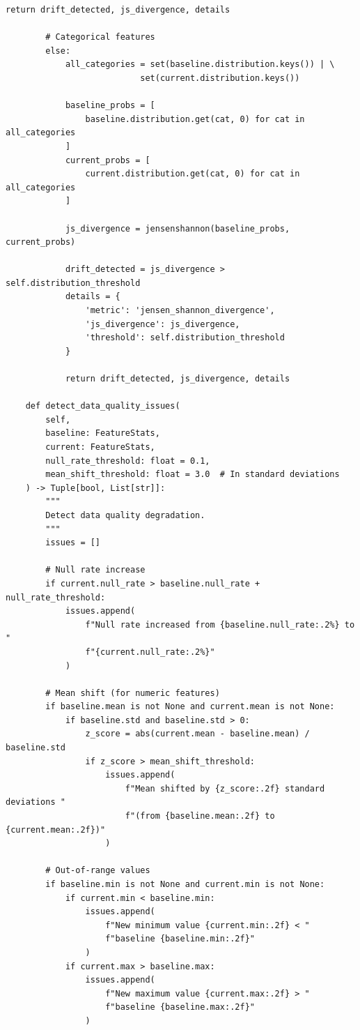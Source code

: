 \begin{lstlisting}[style=python, caption=Comprehensive feature monitoring and drift detection]
            return drift_detected, js_divergence, details

        # Categorical features
        else:
            all_categories = set(baseline.distribution.keys()) | \
                           set(current.distribution.keys())

            baseline_probs = [
                baseline.distribution.get(cat, 0) for cat in all_categories
            ]
            current_probs = [
                current.distribution.get(cat, 0) for cat in all_categories
            ]

            js_divergence = jensenshannon(baseline_probs, current_probs)

            drift_detected = js_divergence > self.distribution_threshold
            details = {
                'metric': 'jensen_shannon_divergence',
                'js_divergence': js_divergence,
                'threshold': self.distribution_threshold
            }

            return drift_detected, js_divergence, details

    def detect_data_quality_issues(
        self,
        baseline: FeatureStats,
        current: FeatureStats,
        null_rate_threshold: float = 0.1,
        mean_shift_threshold: float = 3.0  # In standard deviations
    ) -> Tuple[bool, List[str]]:
        """
        Detect data quality degradation.
        """
        issues = []

        # Null rate increase
        if current.null_rate > baseline.null_rate + null_rate_threshold:
            issues.append(
                f"Null rate increased from {baseline.null_rate:.2%} to "
                f"{current.null_rate:.2%}"
            )

        # Mean shift (for numeric features)
        if baseline.mean is not None and current.mean is not None:
            if baseline.std and baseline.std > 0:
                z_score = abs(current.mean - baseline.mean) / baseline.std
                if z_score > mean_shift_threshold:
                    issues.append(
                        f"Mean shifted by {z_score:.2f} standard deviations "
                        f"(from {baseline.mean:.2f} to {current.mean:.2f})"
                    )

        # Out-of-range values
        if baseline.min is not None and current.min is not None:
            if current.min < baseline.min:
                issues.append(
                    f"New minimum value {current.min:.2f} < "
                    f"baseline {baseline.min:.2f}"
                )
            if current.max > baseline.max:
                issues.append(
                    f"New maximum value {current.max:.2f} > "
                    f"baseline {baseline.max:.2f}"
                )


\end{lstlisting}
